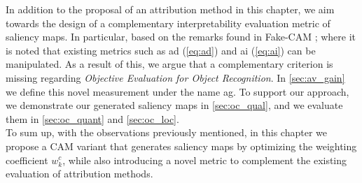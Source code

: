 \noindent In addition to the proposal of an attribution method in this chapter, we aim towards the 
design of a complementary interpretability evaluation metric of saliency maps. In particular, 
based on the remarks found in Fake-CAM \autocite{poppi2021revisiting}; where it is noted that 
existing metrics such as \gls{ad} (\ref{eq:ad}) and \gls{ai} (\ref{eq:ai}) can be manipulated. As a 
result of this, we argue that a complementary criterion is missing regarding \textit{Objective 
Evaluation for Object Recognition}. In \autoref{sec:av_gain} we define this novel measurement 
under the name \gls{ag}. To support our approach, we demonstrate our generated saliency maps in 
\autoref{sec:oc_qual}, and we evaluate them in \autoref{sec:oc_quant} and \autoref{sec:oc_loc}.\\

\noindent To sum up, with the observations previously mentioned, in this chapter we propose a CAM 
variant that generates saliency maps by optimizing the weighting coefficient $w_k^c$, while also 
introducing a novel metric to complement the existing evaluation of attribution methods.\\










%
